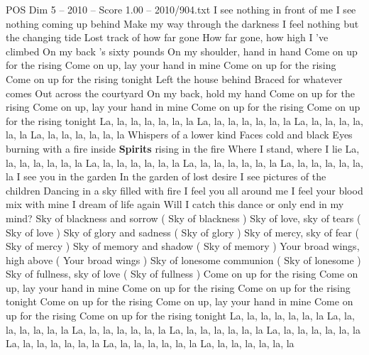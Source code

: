 \begin{textsample}{POS Dim 5 – 2010 – Score 1.00 – 2010/904.txt}  \label{ex:f5_pos_035}
I see nothing in front of me I see nothing coming up behind Make my way through the darkness I feel nothing but the changing tide Lost track of how far gone How far gone, how high I 've climbed On my back 's sixty pounds On my shoulder, hand in hand Come on up for the rising Come on up, lay your hand in mine Come on up for the rising Come on up for the rising tonight Left the house behind Braced for whatever comes Out across the courtyard On my back, hold my hand Come on up for the rising Come on up, lay your hand in mine Come on up for the rising Come on up for the rising tonight La, la, la, la, la, la, la La, la, la, la, la, la, la La, la, la, la, la, la, la La, la, la, la, la, la, la Whispers of a lower kind Faces cold and black Eyes burning with a fire inside \textbf{Spirits} rising in the fire Where I stand, where I lie La, la, la, la, la, la, la La, la, la, la, la, la, la La, la, la, la, la, la, la La, la, la, la, la, la, la I see you in the garden In the garden of lost desire I see pictures of the children Dancing in a sky filled with fire I feel you all around me I feel your blood mix with mine I dream of life again Will I catch this dance or only end in my mind?
Sky of blackness and sorrow ( Sky of blackness ) Sky of love, sky of tears ( Sky of love ) Sky of glory and sadness ( Sky of glory ) Sky of mercy, sky of fear ( Sky of mercy ) Sky of memory and shadow ( Sky of memory ) Your broad wings, high above ( Your broad wings ) Sky of lonesome communion ( Sky of lonesome ) Sky of fullness, sky of love ( Sky of fullness ) Come on up for the rising Come on up, lay your hand in mine Come on up for the rising Come on up for the rising tonight Come on up for the rising Come on up, lay your hand in mine Come on up for the rising Come on up for the rising tonight La, la, la, la, la, la, la La, la, la, la, la, la, la La, la, la, la, la, la, la La, la, la, la, la, la, la La, la, la, la, la, la, la La, la, la, la, la, la, la La, la, la, la, la, la, la La, la, la, la, la, la, la

\end{textsample}
